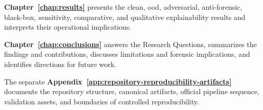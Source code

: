 \textbf{Chapter~\ref{chap:results}} presents the clean, \gls{ood}, adversarial,
anti-forensic, black-box, sensitivity, comparative, and qualitative
explainability results and interprets their operational implications.

\textbf{Chapter~\ref{chap:conclusions}} answers the Research Questions,
summarizes the findings and contributions, discusses limitations and forensic
implications, and identifies directions for future work.

The separate
\textbf{Appendix~\ref{app:repository-reproducibility-artifacts}} documents the
repository structure, canonical artifacts, official pipeline sequence,
validation assets, and boundaries of controlled reproducibility.
